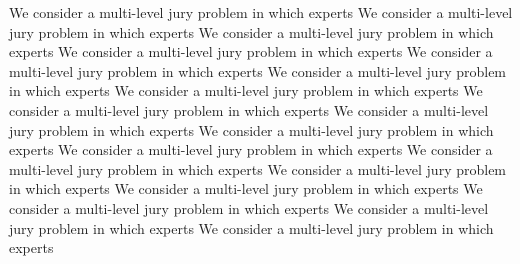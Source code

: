 \documentclass[letterpaper]{article}
\theoremstyle{definition}
\begin{document}
We consider a multi-level jury problem in which experts
We consider a multi-level jury problem in which experts
We consider a multi-level jury problem in which experts
We consider a multi-level jury problem in which experts
We consider a multi-level jury problem in which experts
We consider a multi-level jury problem in which experts
We consider a multi-level jury problem in which experts
We consider a multi-level jury problem in which experts
We consider a multi-level jury problem in which experts
We consider a multi-level jury problem in which experts
We consider a multi-level jury problem in which experts
We consider a multi-level jury problem in which experts
We consider a multi-level jury problem in which experts
We consider a multi-level jury problem in which experts
We consider a multi-level jury problem in which experts
We consider a multi-level jury problem in which experts
We consider a multi-level jury problem in which experts
\clearpage

\end{document}
